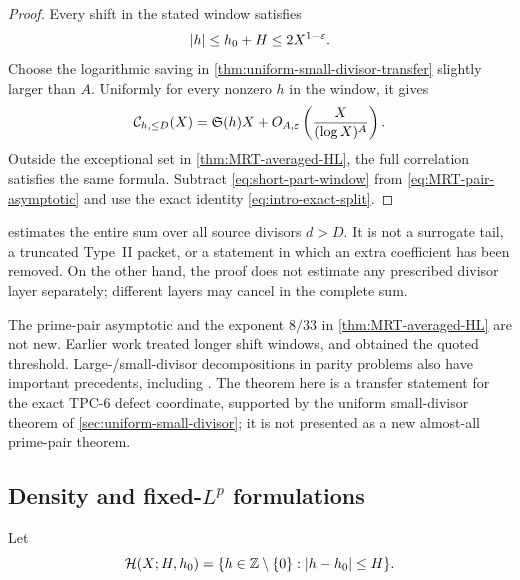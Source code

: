 \begin{proof}
Every shift in the stated window satisfies
\[
 |h|\le h_0+H\le2X^{1-\varepsilon}.
\]
Choose the logarithmic saving in
\cref{thm:uniform-small-divisor-transfer} slightly larger than $A$.
Uniformly for every nonzero $h$ in the window, it gives
\begin{equation}\label{eq:short-part-window}
 \mathcal C_{h,\le D}(X)
 =\mathfrak S(h)X
 +O_{A,\varepsilon}\left(\frac{X}{(\log X)^A}\right).
\end{equation}
Outside the exceptional set in \cref{thm:MRT-averaged-HL}, the full
correlation satisfies the same formula.  Subtract
\eqref{eq:short-part-window} from \eqref{eq:MRT-pair-asymptotic} and use the
exact identity \eqref{eq:intro-exact-split}.
\end{proof}

\begin{remark}
 estimates the entire sum over all
source divisors $d>D$.  It is not a surrogate tail, a truncated Type~II
packet, or a statement in which an extra coefficient has been removed.
On the other hand, the proof does not estimate any prescribed divisor layer
separately; different layers may cancel in the complete sum.
\end{remark}

\begin{remark}
The prime-pair asymptotic and the exponent $8/33$ in
\cref{thm:MRT-averaged-HL} are not new.  Earlier work treated longer shift
windows, and \citet{MatomakiRadziwillTao2019} obtained the quoted threshold.
Large-/small-divisor decompositions in parity problems also have important
precedents, including \citet{MurtyVatwani2017}.  The theorem here is a
transfer statement for the exact TPC-6 defect coordinate, supported by the
uniform small-divisor theorem of \cref{sec:uniform-small-divisor}; it is not
presented as a new almost-all prime-pair theorem.
\end{remark}

\subsection{Density and \texorpdfstring{fixed-$L^p$}{fixed-Lp} formulations}
\label{subsec:density-Lp}

Let
\begin{equation}\label{eq:shift-window-set}
 \mathcal H(X;H,h_0)=
 \{h\in\mathbb Z\setminus\{0\}:|h-h_0|\le H\}.
\end{equation}

